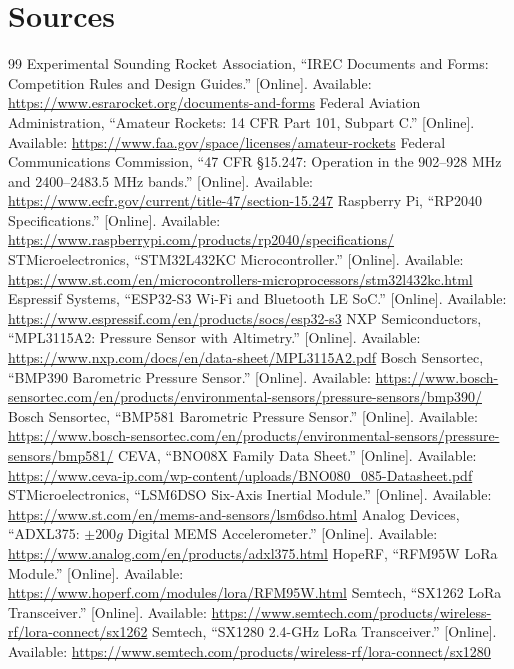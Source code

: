 \documentclass[11pt]{IEEEtran}
\begin{document}
\section{Sources}
\begin{thebibliography}{99}\small
{} Experimental Sounding Rocket Association, ``IREC Documents and Forms: Competition Rules and Design Guides.'' [Online]. Available: \url{https://www.esrarocket.org/documents-and-forms}
 Federal Aviation Administration, ``Amateur Rockets: 14 CFR Part 101, Subpart C.'' [Online]. Available: \url{https://www.faa.gov/space/licenses/amateur-rockets}
 Federal Communications Commission, ``47 CFR \S 15.247: Operation in the 902--928 MHz and 2400--2483.5 MHz bands.'' [Online]. Available: \url{https://www.ecfr.gov/current/title-47/section-15.247}
 Raspberry Pi, ``RP2040 Specifications.'' [Online]. Available: \url{https://www.raspberrypi.com/products/rp2040/specifications/}
 STMicroelectronics, ``STM32L432KC Microcontroller.'' [Online]. Available: \url{https://www.st.com/en/microcontrollers-microprocessors/stm32l432kc.html}
 Espressif Systems, ``ESP32-S3 Wi-Fi and Bluetooth LE SoC.'' [Online]. Available: \url{https://www.espressif.com/en/products/socs/esp32-s3}
 NXP Semiconductors, ``MPL3115A2: Pressure Sensor with Altimetry.'' [Online]. Available: \url{https://www.nxp.com/docs/en/data-sheet/MPL3115A2.pdf}
 Bosch Sensortec, ``BMP390 Barometric Pressure Sensor.'' [Online]. Available: \url{https://www.bosch-sensortec.com/en/products/environmental-sensors/pressure-sensors/bmp390/}
 Bosch Sensortec, ``BMP581 Barometric Pressure Sensor.'' [Online]. Available: \url{https://www.bosch-sensortec.com/en/products/environmental-sensors/pressure-sensors/bmp581/}
 CEVA, ``BNO08X Family Data Sheet.'' [Online]. Available: \url{https://www.ceva-ip.com/wp-content/uploads/BNO080_085-Datasheet.pdf}
 STMicroelectronics, ``LSM6DSO Six-Axis Inertial Module.'' [Online]. Available: \url{https://www.st.com/en/mems-and-sensors/lsm6dso.html}
 Analog Devices, ``ADXL375: $\pm200g$ Digital MEMS Accelerometer.'' [Online]. Available: \url{https://www.analog.com/en/products/adxl375.html}
 HopeRF, ``RFM95W LoRa Module.'' [Online]. Available: \url{https://www.hoperf.com/modules/lora/RFM95W.html}
 Semtech, ``SX1262 LoRa Transceiver.'' [Online]. Available: \url{https://www.semtech.com/products/wireless-rf/lora-connect/sx1262}
 Semtech, ``SX1280 2.4-GHz LoRa Transceiver.'' [Online]. Available: \url{https://www.semtech.com/products/wireless-rf/lora-connect/sx1280}

\end{thebibliography}
\end{document}
